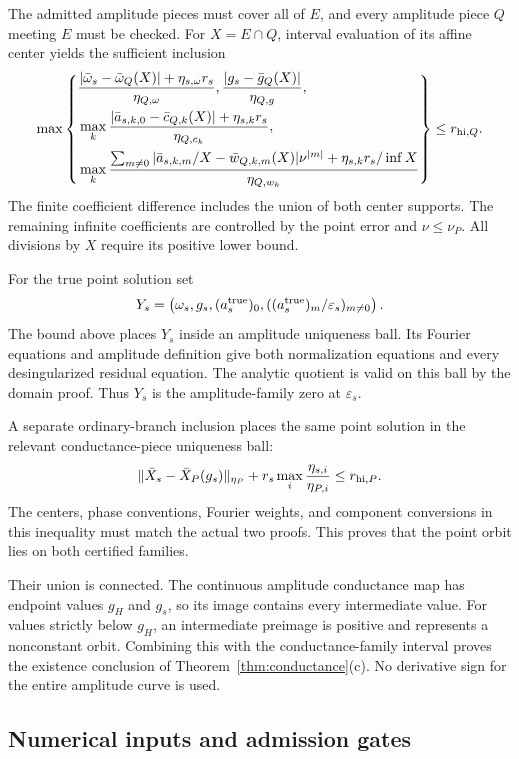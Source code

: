 \documentclass[11pt]{article}
\theoremstyle{definition}
\begin{document}
The admitted amplitude pieces must cover all of $E$, and every amplitude piece $Q$ meeting $E$ must be checked. For $X=E\cap Q$, interval evaluation of its affine center yields the sufficient inclusion
\[
 \max\left\{\begin{aligned}
 &\frac{|\bar\omega_s-\bar\omega_Q(X)|+\eta_{s,\omega}r_s}
      {\eta_{Q,\omega}},
 \frac{|g_s-\bar g_Q(X)|}{\eta_{Q,g}},\\
 &\max_k\frac{|\bar a_{s,k,0}-\bar c_{Q,k}(X)|
                                     +\eta_{s,k}r_s}{\eta_{Q,c_k}},\\
 &\max_k
 \frac{\sum_{m\ne0}|\bar a_{s,k,m}/X-\bar w_{Q,k,m}(X)|\nu^{|m|}
                          +\eta_{s,k}r_s/\inf X}{\eta_{Q,w_k}}
 \end{aligned}\right\}\le r_{{\rm hi},Q}.
\]
The finite coefficient difference includes the union of both center supports. The remaining infinite coefficients are controlled by the point error and $\nu\le\nu_P$. All divisions by $X$ require its positive lower bound.

For the true point solution set
\[
 Y_s=\left(\omega_s,g_s,(a_s^{\rm true})_0,
            ((a_s^{\rm true})_m/\varepsilon_s)_{m\ne0}\right).
\]
The bound above places $Y_s$ inside an amplitude uniqueness ball. Its Fourier equations and amplitude definition give both normalization equations and every desingularized residual equation. The analytic quotient is valid on this ball by the domain proof. Thus $Y_s$ is the amplitude-family zero at $\varepsilon_s$.

A separate ordinary-branch inclusion places the same point solution in the relevant conductance-piece uniqueness ball:
\[
 \|\bar X_s-\bar X_P(g_s)\|_{\eta_P}
       +r_s\max_i\frac{\eta_{s,i}}{\eta_{P,i}}
       \le r_{{\rm hi},P}.
\]
The centers, phase conventions, Fourier weights, and component conversions in this inequality must match the actual two proofs. This proves that the point orbit lies on both certified families.

Their union is connected. The continuous amplitude conductance map has endpoint values $g_H$ and $g_s$, so its image contains every intermediate value. For values strictly below $g_H$, an intermediate preimage is positive and represents a nonconstant orbit. Combining this with the conductance-family interval proves the existence conclusion of Theorem~\ref{thm:conductance}(c). No derivative sign for the entire amplitude curve is used.


\subsection{Numerical inputs and admission gates}\label{sec:conductance-gates}\label{sec:ha-12}
\end{document}
